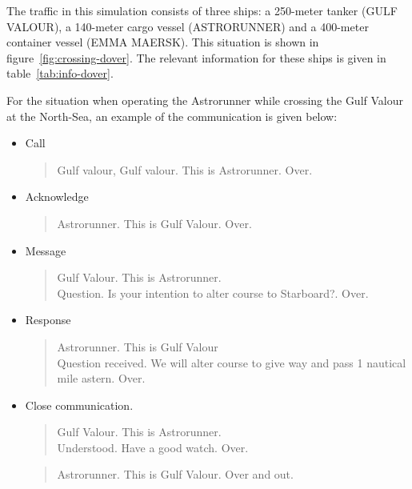 The traffic in this simulation consists of three ships: a 250-meter tanker (GULF VALOUR), a 140-meter cargo vessel (ASTRORUNNER) and a 400-meter container vessel (EMMA MAERSK). This situation is shown in figure~\ref{fig:crossing-dover}. The relevant information for these ships is given in table~\ref{tab:info-dover}.

For the situation when operating the Astrorunner while crossing the Gulf Valour at the North-Sea, an example of the communication is given below:
\begin{spacing}{1}
	\begin{itemize}
		\item Call
		\begin{quote}
			Gulf valour, Gulf valour. This is Astrorunner. Over.
		\end{quote}
		\item Acknowledge
		\begin{quote}
			Astrorunner. This is Gulf Valour. Over.
		\end{quote}
		\item Message
		\begin{quote}
			Gulf Valour. This is Astrorunner. \\
			Question. Is your intention to alter course to Starboard?. Over.
		\end{quote}
		\item Response
		\begin{quote}
			Astrorunner. This is Gulf Valour \\
			Question received. We will alter course to give way and pass 1 nautical mile astern. Over.
		\end{quote}
		\item Close communication.
		\begin{quote}
			Gulf Valour. This is Astrorunner.\\
			Understood. Have a good watch. Over.
		\end{quote}
		\begin{quote}
			Astrorunner. This is Gulf Valour. Over and out.
		\end{quote}
	\end{itemize}
\end{spacing}

